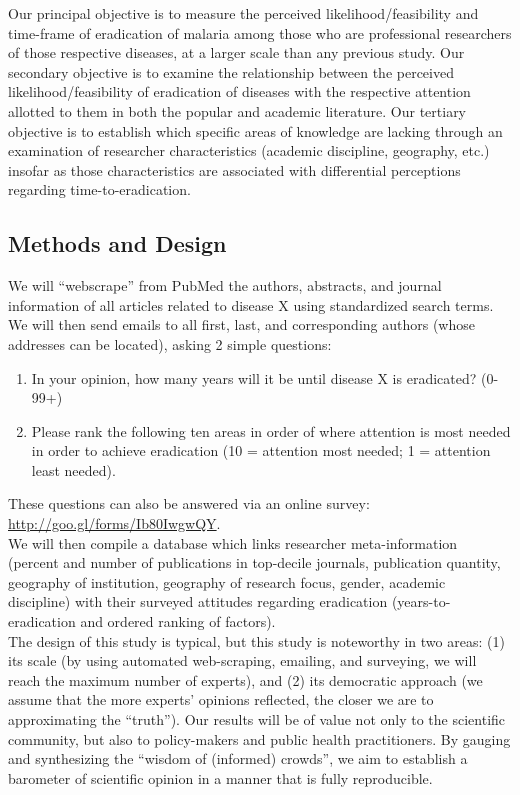 \documentclass{article}
\begin{document}
\noindent Our principal objective is to measure the perceived likelihood/feasibility and time-frame of eradication of malaria among those who are professional researchers of those respective diseases, at a larger scale than any previous study. Our secondary objective is to examine the relationship between the perceived likelihood/feasibility of eradication of diseases with the respective attention allotted to them in both the popular and academic literature. Our tertiary objective is to establish which specific areas of knowledge are lacking through an examination of researcher characteristics (academic discipline, geography, etc.) insofar as those characteristics are associated with differential perceptions regarding time-to-eradication.


\subsection*{Methods and Design}

We will “webscrape” from PubMed the authors, abstracts, and journal information of all articles related to disease X using standardized search terms. We will then send emails to all first, last, and corresponding authors (whose addresses can be located), asking 2 simple questions:  
\begin{enumerate}
\item In your opinion, how many years will it be until disease X is eradicated? (0-99+)
\item Please rank the following ten areas in order of where attention is most needed in order to achieve eradication (10 = attention most needed; 1 = attention least needed).
\end{enumerate}

\noindent These questions can also be answered via an online survey: \href{http://goo.gl/forms/Ib80IwgwQY}{http://goo.gl/forms/Ib80IwgwQY}. \\


\noindent We will then compile a database which links researcher meta-information (percent and number of publications in top-decile journals, publication quantity, geography of institution, geography of research focus, gender, academic discipline) with their surveyed attitudes regarding eradication (years-to-eradication and ordered ranking of factors). \\


\noindent The design of this study is typical, but this study is noteworthy in two areas: (1) its scale (by using automated web-scraping, emailing, and surveying, we will reach the maximum number of experts), and (2) its democratic approach (we assume that the more experts’ opinions reflected, the closer we are to approximating the “truth”). Our results will be of value not only to the scientific community, but also to policy-makers and public health practitioners. By gauging and synthesizing the “wisdom of (informed) crowds”, we aim to establish a barometer of scientific opinion in a manner that is fully reproducible.
\end{document}

